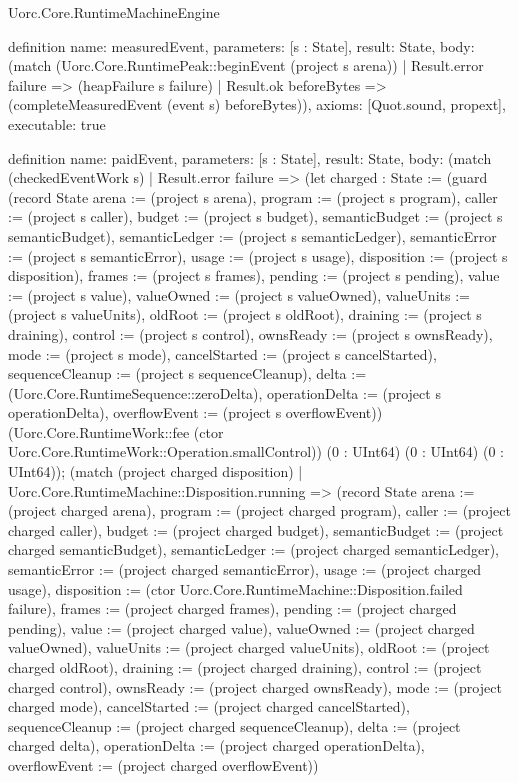 \begin{lexlean}{Uorc.Core.RuntimeMachineEngine}
\begin{semanticmodule}
definition{
  name: measuredEvent,
  parameters: [s : State],
  result: State,
  body: (match (Uorc.Core.RuntimePeak::beginEvent (project s arena))
    | Result.error failure => (heapFailure s failure)
    | Result.ok beforeBytes => (completeMeasuredEvent (event s) beforeBytes)),
  axioms: [Quot.sound, propext],
  executable: true
}

definition{
  name: paidEvent,
  parameters: [s : State],
  result: State,
  body: (match (checkedEventWork s)
    | Result.error failure => (let charged : State := (guard (record State {arena := (project s arena), program := (project s program), caller := (project s caller), budget := (project s budget), semanticBudget := (project s semanticBudget), semanticLedger := (project s semanticLedger), semanticError := (project s semanticError), usage := (project s usage), disposition := (project s disposition), frames := (project s frames), pending := (project s pending), value := (project s value), valueOwned := (project s valueOwned), valueUnits := (project s valueUnits), oldRoot := (project s oldRoot), draining := (project s draining), control := (project s control), ownsReady := (project s ownsReady), mode := (project s mode), cancelStarted := (project s cancelStarted), sequenceCleanup := (project s sequenceCleanup), delta := (Uorc.Core.RuntimeSequence::zeroDelta), operationDelta := (project s operationDelta), overflowEvent := (project s overflowEvent)}) (Uorc.Core.RuntimeWork::fee (ctor Uorc.Core.RuntimeWork::Operation.smallControl)) (0 : UInt64) (0 : UInt64) (0 : UInt64)); (match (project charged disposition)
      | Uorc.Core.RuntimeMachine::Disposition.running => (record State {arena := (project charged arena), program := (project charged program), caller := (project charged caller), budget := (project charged budget), semanticBudget := (project charged semanticBudget), semanticLedger := (project charged semanticLedger), semanticError := (project charged semanticError), usage := (project charged usage), disposition := (ctor Uorc.Core.RuntimeMachine::Disposition.failed failure), frames := (project charged frames), pending := (project charged pending), value := (project charged value), valueOwned := (project charged valueOwned), valueUnits := (project charged valueUnits), oldRoot := (project charged oldRoot), draining := (project charged draining), control := (project charged control), ownsReady := (project charged ownsReady), mode := (project charged mode), cancelStarted := (project charged cancelStarted), sequenceCleanup := (project charged sequenceCleanup), delta := (project charged delta), operationDelta := (project charged operationDelta), overflowEvent := (project charged overflowEvent)})
}
\end{semanticmodule}
\end{lexlean}
